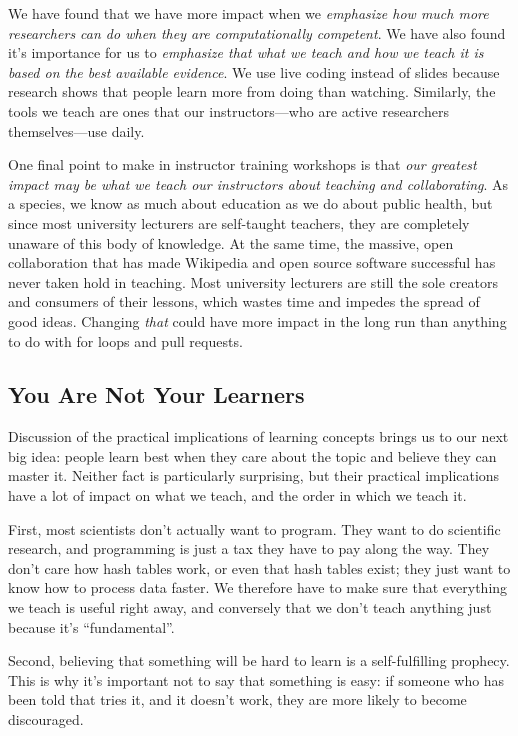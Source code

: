 We have found that we have more impact when we \emph{emphasize how much
more researchers can do when they are computationally competent}. We
have also found it's importance for us to \emph{emphasize that what we
teach and how we teach it is based on the best available evidence}. We
use live coding instead of slides because research shows that people
learn more from doing than watching. Similarly, the tools we teach are
ones that our instructors---who are active researchers themselves---use
daily.

One final point to make in instructor training workshops is that
\emph{our greatest impact may be what we teach our instructors about
teaching and collaborating}. As a species, we know as much about
education as we do about public health, but since most university
lecturers are self-taught teachers, they are completely unaware of this
body of knowledge. At the same time, the massive, open collaboration
that has made Wikipedia and open source software successful has never
taken hold in teaching. Most university lecturers are still the sole
creators and consumers of their lessons, which wastes time and impedes
the spread of good ideas. Changing \emph{that} could have more impact in
the long run than anything to do with for loops and pull requests.

\subsection{You Are Not Your Learners}\label{you-are-not-your-learners}

Discussion of the practical implications of learning concepts brings us
to our next big idea: people learn best when they care about the topic
and believe they can master it. Neither fact is particularly surprising,
but their practical implications have a lot of impact on what we teach,
and the order in which we teach it.

First, most scientists don't actually want to program. They want to do
scientific research, and programming is just a tax they have to pay
along the way. They don't care how hash tables work, or even that hash
tables exist; they just want to know how to process data faster. We
therefore have to make sure that everything we teach is useful right
away, and conversely that we don't teach anything just because it's
``fundamental''.

Second, believing that something will be hard to learn is a
self-fulfilling prophecy. This is why it's important not to say that
something is easy: if someone who has been told that tries it, and it
doesn't work, they are more likely to become discouraged.

